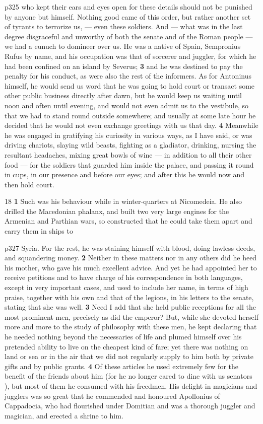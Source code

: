 p325 who kept their ears and eyes open for these details should not be punished by anyone but himself. Nothing good came of this order, but rather another set of tyrants to terrorize us, \texthebrew{—} even these soldiers. And \texthebrew{—} what was in the last degree disgraceful and unworthy of both the senate and of the Roman people \texthebrew{—} we had a eunuch to domineer over us. He was a native of Spain, Sempronius Rufus by name, and his occupation was that of sorcerer and juggler, for which he had been confined on an island by Severus; \textbf{3} and he was destined to pay the penalty for his conduct, as were also the rest of the informers. As for Antoninus himself, he would send us word that he was going to hold court or transact some other public business directly after dawn, but he would keep us waiting until noon and often until evening, and would not even admit us to the vestibule, so that we had to stand round outside somewhere; and usually at some late hour he decided that he would not even exchange greetings with us that day. \textbf{4} Meanwhile he was engaged in gratifying his curiosity in various ways, as I have said, or was driving chariots, slaying wild beasts, fighting as a gladiator, drinking, nursing the resultant headaches, mixing great bowls of wine \texthebrew{—} in addition to all their other food \texthebrew{—} for the soldiers that guarded him inside the palace, and passing it round in cups, in our presence and before our eyes; and after this he would now and then hold court.

18
\textbf{1} Such was his behaviour while in winter-quarters at Nicomedeia. He also drilled the Macedonian phalanx, and built two very large engines for the Armenian and Parthian wars, so constructed that he could take them apart and carry them in ships to

p327 Syria. For the rest, he was staining himself with blood, doing lawless deeds, and squandering money. \textbf{2} Neither in these matters nor in any others did he heed his mother, who gave his much excellent advice. And yet he had appointed her to receive petitions and to have charge of his correspondence in both languages, except in very important cases, and used to include her name, in terms of high praise, together with his own and that of the legions, in his letters to the senate, stating that she was well. \textbf{3} Need I add that she held public receptions for all the most prominent men, precisely as did the emperor? But, while she devoted herself more and more to the study of philosophy with these men, he kept declaring that he needed nothing beyond the necessaries of life and plumed himself over his pretended ability to live on the cheapest kind of fare; yet there was nothing on land or sea or in the air that we did not regularly supply to him both by private gifts and by public grants. \textbf{4} Of these articles he used extremely few for the benefit of the friends about him (for he no longer cared to dine with us senators ), but most of them he consumed with his freedmen. His delight in magicians and jugglers was so great that he commended and honoured Apollonius of Cappadocia, who had flourished under Domitian and was a thorough juggler and magician, and erected a shrine to him.


